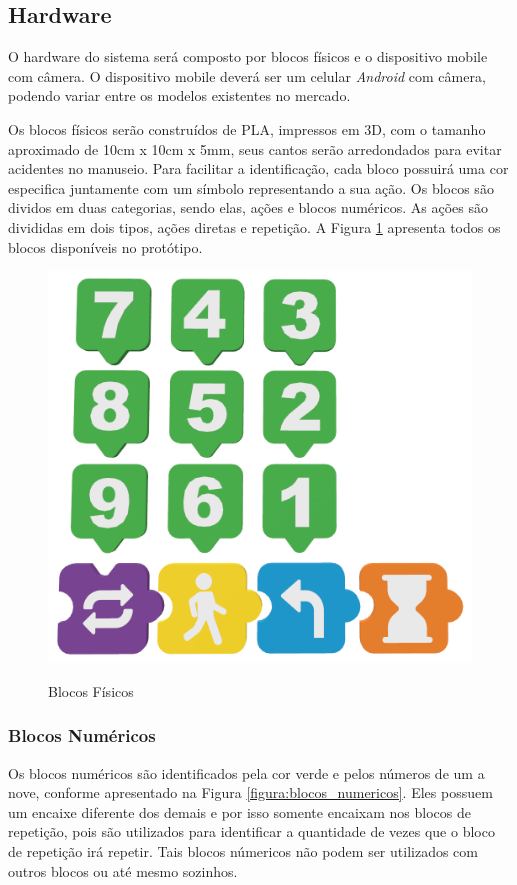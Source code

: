     \subsection{Hardware}
    O hardware do sistema será composto por blocos físicos e o dispositivo mobile com câmera. O dispositivo mobile deverá ser um celular \textit{Android} com câmera, podendo variar entre os modelos existentes no mercado.
    
    Os blocos físicos serão construídos de PLA, impressos em 3D, com o tamanho aproximado de 10cm x 10cm x 5mm, seus cantos serão arredondados para evitar acidentes no manuseio. Para facilitar a identificação, cada bloco possuirá uma cor especifica juntamente com um símbolo representando a sua ação.
    Os blocos são dividos em duas categorias, sendo elas, ações e blocos numéricos. As ações são divididas em dois tipos, ações diretas e repetição. A Figura \ref{figura:blocos_fisicos} apresenta todos os blocos disponíveis no protótipo.
    
    \begin{figure}[H]
        \caption{Blocos Físicos}
        \centering
        \includegraphics[width=\linewidth]{Imagens/Cap3/Blocos/Todos.png}
        \label{figura:blocos_fisicos}
    \end{figure}
    
    \subsubsection{Blocos Numéricos}
        Os blocos numéricos são identificados pela cor verde e pelos números de um a nove, conforme apresentado na Figura \ref{figura:blocos_numericos}. Eles possuem um encaixe diferente dos demais e por isso somente encaixam nos blocos de repetição, pois são utilizados para identificar a quantidade de vezes que o bloco de repetição irá repetir. Tais blocos númericos não podem ser utilizados com outros blocos ou até mesmo sozinhos.
        
